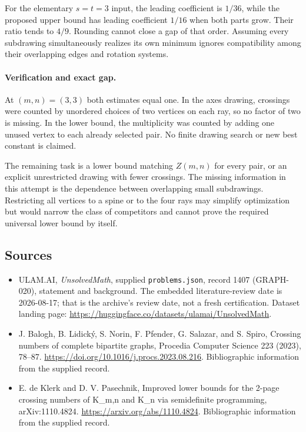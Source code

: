 \documentclass[11pt,a4paper]{article}
\begin{document}
For the elementary $s=t=3$ input, the leading coefficient is $1/36$, while the proposed upper bound has leading coefficient $1/16$ when both parts grow. Their ratio tends to $4/9$. Rounding cannot close a gap of that order. Assuming every subdrawing simultaneously realizes its own minimum ignores compatibility among their overlapping edges and rotation systems.

\paragraph{Verification and exact gap.}
At $(m,n)=(3,3)$ both estimates equal one. In the axes drawing, crossings were counted by unordered choices of two vertices on each ray, so no factor of two is missing. In the lower bound, the multiplicity was counted by adding one unused vertex to each already selected pair. No finite drawing search or new best constant is claimed.

The remaining task is a lower bound matching $Z(m,n)$ for every pair, or an explicit unrestricted drawing with fewer crossings. The missing information in this attempt is the dependence between overlapping small subdrawings. Restricting all vertices to a spine or to the four rays may simplify optimization but would narrow the class of competitors and cannot prove the required universal lower bound by itself.

\subsection{Sources}

{\small

\begin{itemize}

\item[\hypertarget{source:1407:1}{S1}] ULAM.AI, \emph{UnsolvedMath}, supplied \texttt{problems.json}, record 1407 (GRAPH-020), statement and background. The embedded literature-review date is 2026-08-17; that is the archive’s review date, not a fresh certification. Dataset landing page: \url{https://huggingface.co/datasets/ulamai/UnsolvedMath}.

\item[\hypertarget{source:1407:2}{S2}] J. Balogh, B. Lidický, S. Norin, F. Pfender, G. Salazar, and S. Spiro, Crossing numbers of complete bipartite graphs, Procedia Computer Science 223 (2023), 78–87. \url{https://doi.org/10.1016/j.procs.2023.08.216}. Bibliographic information from the supplied record.

\item[\hypertarget{source:1407:3}{S3}] E. de Klerk and D. V. Pasechnik, Improved lower bounds for the 2-page crossing numbers of K\_{m,n} and K\_n via semidefinite programming, arXiv:1110.4824. \url{https://arxiv.org/abs/1110.4824}. Bibliographic information from the supplied record.

\end{itemize}

}

\label{end:1407}
\end{document}

